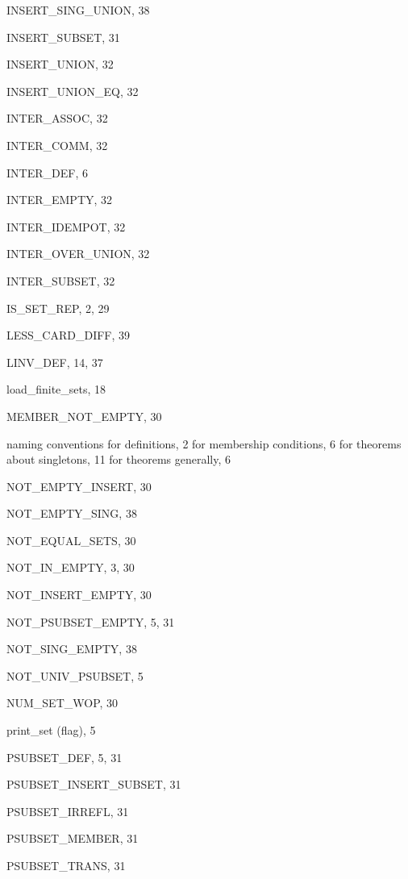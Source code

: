 \begin{theindex}
  \item {\ptt INSERT\_SING\_UNION}, 38
  \item {\ptt INSERT\_SUBSET}, 31
  \item {\ptt INSERT\_UNION}, 32
  \item {\ptt INSERT\_UNION\_EQ}, 32
  \item {\ptt INTER\_ASSOC}, 32
  \item {\ptt INTER\_COMM}, 32
  \item {\ptt INTER\_DEF}, 6
  \item {\ptt INTER\_EMPTY}, 32
  \item {\ptt INTER\_IDEMPOT}, 32
  \item {\ptt INTER\_OVER\_UNION}, 32
  \item {\ptt INTER\_SUBSET}, 32
  \item {\ptt IS\_SET\_REP}, 2, 29

  \indexspace

  \item {\ptt LESS\_CARD\_DIFF}, 39
  \item {\ptt LINV\_DEF}, 14, 37
  \item {\ptt load\_finite\_sets}, 18

  \indexspace

  \item {\ptt MEMBER\_NOT\_EMPTY}, 30

  \indexspace

  \item naming conventions
    \subitem for definitions, 2
    \subitem for membership conditions, 6
    \subitem for theorems about singletons, 11
    \subitem for theorems generally, 6
  \item {\ptt NOT\_EMPTY\_INSERT}, 30
  \item {\ptt NOT\_EMPTY\_SING}, 38
  \item {\ptt NOT\_EQUAL\_SETS}, 30
  \item {\ptt NOT\_IN\_EMPTY}, 3, 30
  \item {\ptt NOT\_INSERT\_EMPTY}, 30
  \item {\ptt NOT\_PSUBSET\_EMPTY}, 5, 31
  \item {\ptt NOT\_SING\_EMPTY}, 38
  \item {\ptt NOT\_UNIV\_PSUBSET}, 5
  \item {\ptt NUM\_SET\_WOP}, 30

  \indexspace

  \item {\ptt print\_set} (flag), 5
  \item {\ptt PSUBSET\_DEF}, 5, 31
  \item {\ptt PSUBSET\_INSERT\_SUBSET}, 31
  \item {\ptt PSUBSET\_IRREFL}, 31
  \item {\ptt PSUBSET\_MEMBER}, 31
  \item {\ptt PSUBSET\_TRANS}, 31


\end{theindex}
